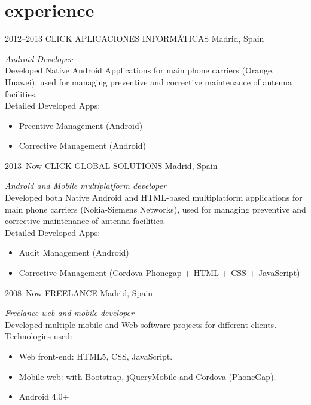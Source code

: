 \documentclass[]{friggeri-cv} %
\begin{document}
\section{experience}

\begin{entrylist}
\entry
{2012--2013}
{CLICK APLICACIONES INFORMÁTICAS}
{Madrid, Spain}
{\emph{Android Developer} \\
Developed Native Android Applications for main phone carriers (Orange, Huawei), used for managing preventive and corrective maintenance of antenna facilities. \\
Detailed Developed Apps:

\begin{itemize}
\item Preentive Management (Android)
\item Corrective Management (Android)
\end{itemize}}

\entry
{2013--Now}
{CLICK GLOBAL SOLUTIONS}
{Madrid, Spain}
{\emph{Android and Mobile multiplatform developer} \\
Developed both Native Android and HTML-based multiplatform applications for main phone carriers (Nokia-Siemens Networks), used for managing preventive and corrective maintenance of antenna facilities. \\
Detailed Developed Apps:

\begin{itemize}
\item Audit Management (Android)
\item Corrective Management (Cordova Phonegap + HTML + CSS + JavaScript)
\end{itemize}}

\entry
{2008--Now}
{FREELANCE}
{Madrid, Spain}
{\emph{Freelance web and mobile developer} \\
Developed multiple mobile and Web software projects for different clients.
Technologies used:

\begin{itemize}
\item Web front-end: HTML5, CSS, JavaScript.
\item Mobile web: with Bootstrap, jQueryMobile and Cordova (PhoneGap).
\item Android 4.0+
\end{itemize}}

\end{entrylist}
\end{document}
